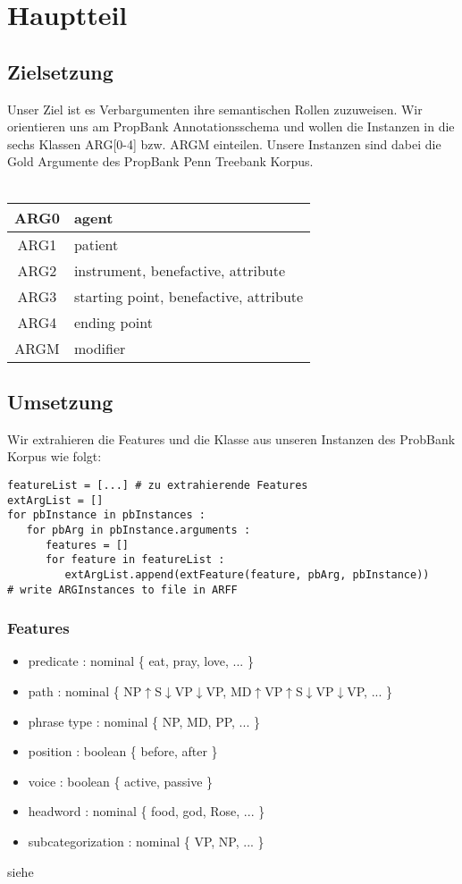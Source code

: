 \documentclass[runningheads]{llncs}
\begin{document}
\section{Hauptteil}
\subsection{Zielsetzung}

Unser Ziel ist es Verbargumenten ihre semantischen Rollen zuzuweisen. Wir orientieren uns am PropBank Annotationsschema und
wollen die Instanzen in die sechs Klassen ARG[0-4] bzw. ARGM einteilen. Unsere Instanzen sind dabei die Gold Argumente des PropBank Penn Treebank Korpus.\\
\\
\begin{table}
\centering
\begin{tabular}{|c|l|}
\hline 
ARG0 & agent \\ 
\hline 
ARG1 & patient \\ 
\hline 
ARG2 & instrument, benefactive, attribute \\ 
\hline 
ARG3 & starting point, benefactive, attribute \\ 
\hline 
ARG4 & ending point \\ 
\hline 
ARGM & modifier \\ 
\hline 
\end{tabular}
\end{table}
 
\subsection{Umsetzung}

Wir extrahieren die Features und die Klasse aus unseren Instanzen des ProbBank Korpus wie folgt:
\begin{lstlisting}[frame=lines]
featureList = [...] # zu extrahierende Features
extArgList = []
for pbInstance in pbInstances :
   for pbArg in pbInstance.arguments :
      features = []
      for feature in featureList :
         extArgList.append(extFeature(feature, pbArg, pbInstance))
# write ARGInstances to file in ARFF
\end{lstlisting}

\subsubsection{Features}
\begin{itemize}
\item predicate : nominal \{ eat, pray, love, ... \}
\item path : nominal \{ NP$\uparrow$S$\downarrow$VP$\downarrow$VP, MD$\uparrow $VP$\uparrow$S$\downarrow$VP$\downarrow$VP, ... \}
\item phrase type : nominal \{ NP, MD, PP, ... \}
\item position : boolean \{ before, after \}
\item voice : boolean \{ active, passive \}
\item headword : nominal \{ food, god, Rose, ... \}
\item subcategorization : nominal \{ VP, NP, ... \}
\end{itemize}
siehe \cite{svm}
\end{document}
